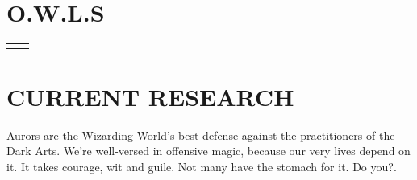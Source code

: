 \documentclass[10pt]{article} %
\begin{document}
\begin{paracol}{2}
\section{O.W.L.S} 





\begin{supertabular}{rl} %
\end{supertabular}



\section{CURRENT RESEARCH}

 {Aurors are the Wizarding World's best defense against the practitioners of the Dark Arts. We're well-versed in offensive magic, because our very lives depend on it. It takes courage, wit and guile. Not many have the stomach for it. Do you?.}

\switchcolumn %



\end{paracol}
\end{document}
